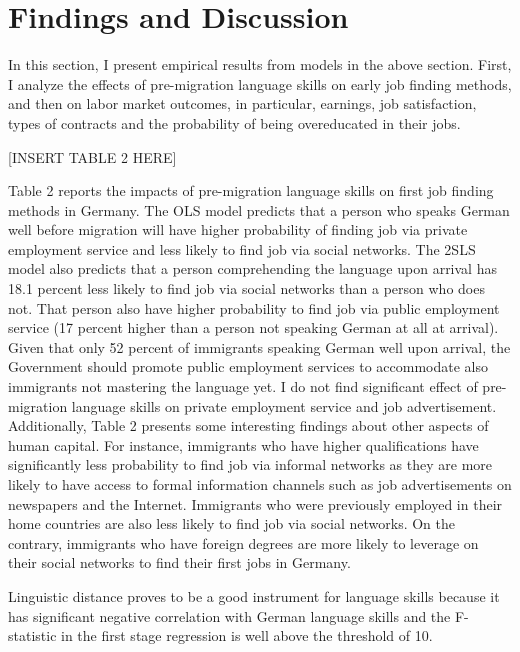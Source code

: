 \documentclass[12pt,a4paper]{article}
\begin{document}
\section{Findings and Discussion}
In this section, I present empirical results from models in the above section. First, I analyze the effects of pre-migration language skills on early job finding methods, and then on labor market outcomes, in particular, earnings, job satisfaction, types of contracts and the probability of being overeducated in their jobs.

\begin{center}
[INSERT TABLE 2 HERE]
\end{center}

Table 2 reports the impacts of pre-migration language skills on first job finding methods in Germany. The OLS model predicts that a person who speaks German well before migration will have higher probability of finding job via private employment service and less likely to find job via social networks. The 2SLS model also predicts that a person comprehending the language upon arrival has 18.1 percent less likely to find job via social networks than a person who does not. That person also have higher probability to find job via public employment service (17 percent higher than a person not speaking German at all at arrival). Given that only 52 percent of immigrants speaking German well upon arrival, the Government should promote public employment services to accommodate also immigrants not mastering the language yet. I do not find significant effect of pre-migration language skills on private employment service and job advertisement. Additionally, Table 2 presents some interesting findings about other aspects of human capital. For instance, immigrants who have higher qualifications have significantly less probability to find job via informal networks as they are more likely to have access to formal information channels such as job advertisements on newspapers and the Internet. Immigrants who were previously employed in their home countries are also less likely to find job via social networks. On the contrary, immigrants who have foreign degrees are more likely to leverage on their social networks to find their first jobs in Germany.

Linguistic distance proves to be a good instrument for language skills because it has significant negative correlation with German language skills and the F-statistic in the first stage regression is well above the threshold of 10.
\end{document}
